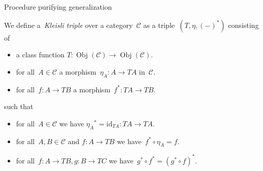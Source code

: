 \documentclass[notes]{beamer}
\newcommand{\cat}[1]{\mathcal{#1}}
\newcommand{\id}{\mathrm{id}}
\DeclareMathOperator{\Obj}{Obj}
\begin{document}
\begin{frame}{Procedure purifying generalization}
    \begin{definition}
        We define a~\emph{Kleisli triple} over a category~\(\cat{C}\) as a
        triple~\((T,\eta,(-)^{\ast})\) consisting of
        \begin{itemize}
            \item a class function
                \(T:\Obj(\cat{C})\longrightarrow\Obj(\cat{C})\).

            \item for all~\(A\in\cat{C}\)
                a morphism~\(\eta_{A}:A\longrightarrow TA\)
                in~\(\cat{C}\).

            \item for all~\(f:A\longrightarrow TB\) a
                morphism~\(f^{\ast}:TA\longrightarrow TB\).
        \end{itemize}
        such that
        \begin{itemize}
            \item for all~\(A\in\cat{C}\) we have
                \({\eta_{A}}^{\ast} = \id_{TA}:TA\longrightarrow TA\).

            \item for all~\(A,B\in\cat{C}\) and \(f:A\longrightarrow TB\) we
                have~\(f^{\ast}\circ\eta_{A} = f\).

            \item for all~\(f:A\to TB,g:B\to TC\) we
                have~\(g^{\ast}\circ f^{\ast} = (g^{\ast}\circ f)^{\ast}\).
        \end{itemize}
    \end{definition}
\end{frame}
\end{document}
